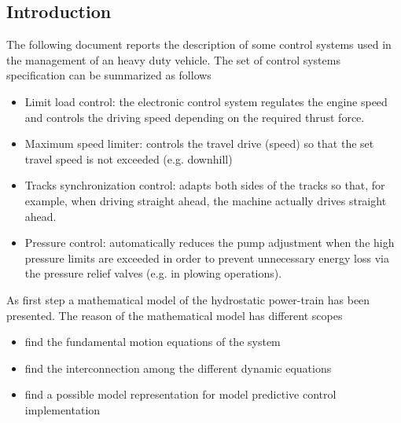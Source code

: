 \documentclass[11pt,a4paper,oneside]{book}
\begin{document}
\begin{onehalfspace}
\section{Introduction}
The following document reports the description of some control systems used in the management of an heavy duty vehicle. The set of control systems specification can be summarized as follows
\begin{itemize} 
	\item Limit load control: the electronic control system regulates the engine speed and controls the driving speed depending on the required thrust force.
	\item Maximum speed limiter: controls the travel drive (speed) so that the set travel speed is not exceeded (e.g. downhill)
	\item Tracks synchronization control: adapts both sides of the tracks so that, for example, when driving straight ahead, the machine actually drives straight ahead.
	\item Pressure control: automatically reduces the pump adjustment when the high pressure limits are exceeded in order to prevent unnecessary energy loss via the pressure relief valves (e.g. in plowing operations).
\end{itemize} 

As first step a mathematical model of the hydrostatic power-train has been presented. The reason of the mathematical model has different scopes
\begin{itemize}
	\item find the fundamental motion equations of the system
	\item find the interconnection among the different dynamic equations
	\item find a possible model representation for model predictive control implementation
\end{itemize}   
%


\end{onehalfspace}
\end{document}
